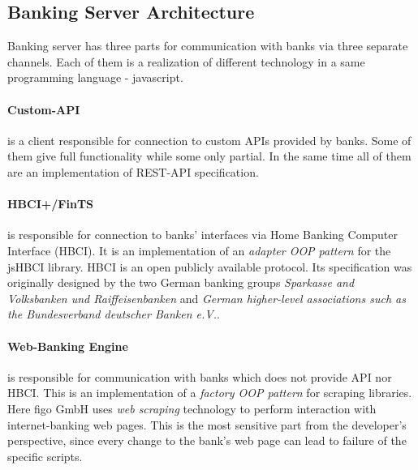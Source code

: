 \subsection{Banking Server Architecture}
\label{sec:bankingArch}
	Banking server has three parts for communication with banks via three separate channels. Each of them is a realization of different technology in a same programming language - javascript.  

	\paragraph{Custom-API} is a client responsible for connection to custom APIs provided by banks. Some of them give full functionality while some only partial. In the same time all of them are an implementation of REST-API specification.
	
	\paragraph{HBCI+/FinTS} is responsible for connection to banks' interfaces via Home Banking Computer Interface (HBCI). It is an implementation of an \textit{adapter OOP pattern} for the jsHBCI library.  HBCI is an open publicly available protocol. Its specification was originally designed by the two German banking groups \textit{Sparkasse and Volksbanken und Raiffeisenbanken} and \textit{German higher-level associations such as the Bundesverband deutscher Banken e.V.}\cite{finTS}.
	
	\paragraph{Web-Banking Engine} is responsible for communication with banks which does not provide API nor HBCI. This is an implementation of a \textit{factory OOP pattern} for scraping libraries. Here figo GmbH uses \textit{web scraping} technology to perform interaction with internet-banking web pages.
	This is the most sensitive part from the developer's perspective, since every change to the bank's web page can lead to failure of the specific scripts. \\
	
	
	
